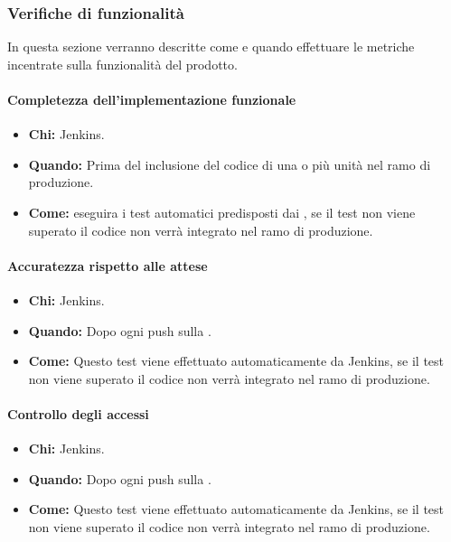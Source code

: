 \newpage
\subsubsection{Verifiche di funzionalità}
In questa sezione verranno descritte come e quando effettuare le metriche incentrate sulla funzionalità del prodotto.

\paragraph{Completezza dell’implementazione funzionale}
\begin{itemize}
\item \textbf{Chi:} Jenkins.
\item \textbf{Quando:} Prima del inclusione del codice di una o più unità nel ramo di produzione.
\item \textbf{Come:}  eseguira i test automatici predisposti dai \ProgrP, se il test non viene superato il codice non verrà integrato nel ramo di produzione.
\end{itemize}

\paragraph{Accuratezza rispetto alle attese}
\begin{itemize}
\item \textbf{Chi:} Jenkins.
\item \textbf{Quando:} Dopo ogni push sulla .
\item \textbf{Come:} Questo test viene effettuato automaticamente da Jenkins, se il test non viene superato il codice non verrà integrato nel ramo di produzione.
\end{itemize}

\paragraph{Controllo degli accessi}
\begin{itemize}
\item \textbf{Chi:} Jenkins.
\item \textbf{Quando:} Dopo ogni push sulla .
\item \textbf{Come:} Questo test viene effettuato automaticamente da Jenkins, se il test non viene superato il codice non verrà integrato nel ramo di produzione.
\end{itemize}